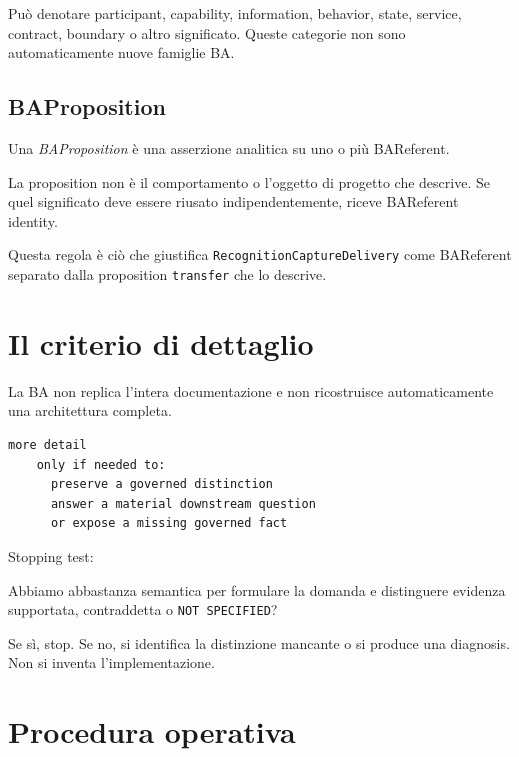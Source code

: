 \documentclass[11pt,a4paper]{article}
\newcommand{\code}[1]{\nolinkurl{#1}}
\newcommand{\BAP}{\textit{BAProposition}}
\begin{document}
Può denotare participant, capability, information, behavior, state, service, contract, boundary o altro significato. Queste categorie non sono automaticamente nuove famiglie BA.

\subsection{BAProposition}

Una \BAP{} è una asserzione analitica su uno o più BAReferent.

\begin{closedbox}
La proposition non è il comportamento o l'oggetto di progetto che descrive. Se quel significato deve essere riusato indipendentemente, riceve BAReferent identity.
\end{closedbox}

Questa regola è ciò che giustifica \code{RecognitionCaptureDelivery} come BAReferent separato dalla proposition \code{transfer} che lo descrive.

\section{Il criterio di dettaglio}

La BA non replica l'intera documentazione e non ricostruisce automaticamente una architettura completa.

\begin{lstlisting}
more detail
    only if needed to:
      preserve a governed distinction
      answer a material downstream question
      or expose a missing governed fact
\end{lstlisting}

Stopping test:

\begin{conceptbox}
Abbiamo abbastanza semantica per formulare la domanda e distinguere evidenza supportata, contraddetta o \code{NOT SPECIFIED}?
\end{conceptbox}

Se sì, stop. Se no, si identifica la distinzione mancante o si produce una diagnosis. Non si inventa l'implementazione.

\section{Procedura operativa}
\end{document}
